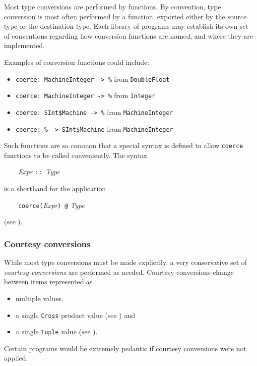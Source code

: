 Most type conversions are performed by functions.
By convention, type conversion is most often performed by a
 function, exported either by the source type or the
destination type.
Each library of \asharp{} programs may establish
its own set of conventions regarding how conversion functions are named,
and where they are implemented.

Examples of conversion functions could include:

\begin{itemize}
\item {\tt coerce: MachineInteger -> \%}       \hfill from {\tt DoubleFloat}
\item {\tt coerce: MachineInteger -> \%}       \hfill from {\tt Integer}
\vskip 2mm

\item {\tt coerce: SInt\$Machine -> \%} \hfill from {\tt MachineInteger}
\item {\tt coerce: \% -> SInt\$Machine} \hfill from {\tt MachineInteger}
\end{itemize}

Such functions are so common that a special syntax is defined to allow
\verb"coerce" functions to be called conveniently.  The syntax

\verb"    "{\it Expr} {\tt ::}~{\it Type}

is a shorthand for the application

\verb"    "{\tt coerce(}{\it Expr\/}{\tt ) \verb"@"} {\it Type}

(see ).

\subsubsection{Courtesy conversions}

While most type conversions must be made explicitly, a very conservative
set of {\em courtesy conversions\/} are performed as needed.
Courtesy conversions change between items represented as
\begin{itemize}
\item multiple values,
\item a single \verb"Cross" product value (see ) and
\item a single \verb"Tuple" value (see ).
\end{itemize}
Certain \asharp{} programs would be extremely pedantic if courtesy conversions
were not applied.

